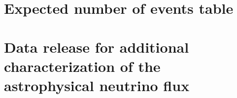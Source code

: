 \documentclass[oneside, letterpaper, 10pt, oldfontcommands]{memoir}
\begin{document}
\section{Expected number of events table\label{sec:events_table}}

%
%
\section{Data release for additional characterization of the astrophysical neutrino flux\label{sec:release}}

\endgroup
\end{document}
